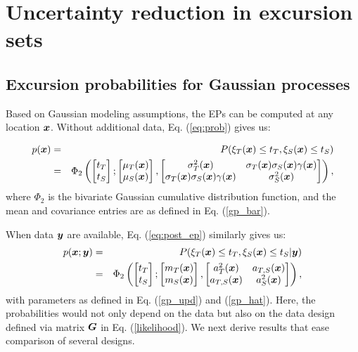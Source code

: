 \documentclass[aoas]{imsart}
\begin{document}
\section{Uncertainty reduction in excursion sets}
\label{sec:sur}

\subsection{Excursion probabilities for Gaussian processes}

Based on Gaussian modeling assumptions, the EPs can be computed at any
location ${\boldsymbol x}$. Without additional data, Eq.  (\ref{eq:prob}) gives us:

\begin{eqnarray}\label{eq:prob_mv0}
 p(\bx) &=& P(\xi_T(\bx) \leq t_T, \xi_S(\bx) \leq t_S) \nonumber \\
 &=& \Phi_2 \begin{pmatrix} 
\begin{bmatrix} t_T\\
t_S
\end{bmatrix};
\begin{bmatrix} \mu_{T}(\bx)\\
\mu_{S}(\bx)
\end{bmatrix},\begin{bmatrix}
\sigma_{T}^2(\bx) & \sigma_{T}(\bx)\sigma_{S}(\bx) \gamma(\bx)  \\
\sigma_{T}(\bx)\sigma_{S}(\bx) \gamma(\bx)  & \sigma_{S}^2(\bx)  
\end{bmatrix}\end{pmatrix},
\end{eqnarray}
where $\Phi_2$ is the bivariate Gaussian cumulative distribution
function, and the mean and covariance entries are as defined in Eq. (\ref{gp_bar}).

When data ${\boldsymbol y}$ are available, Eq. (\ref{eq:post_ep}) similarly gives
us:
\begin{eqnarray}\label{eq:prob_mv}
 p(\bx;\by) &=& P(\xi_T(\bx) \leq t_T, \xi_S(\bx) \leq t_S |\by)
 \nonumber \\
 &=& \Phi_2 \begin{pmatrix} 
\begin{bmatrix} t_T\\
t_S
\end{bmatrix};
\begin{bmatrix} m_{T}(\bx)\\
m_{S}(\bx)
\end{bmatrix},\begin{bmatrix}
a_{T}^2(\bx) & a_{T,S}(\bx)  \\
a_{T,S}(\bx)  & a_{S}^2(\bx)  
\end{bmatrix}\end{pmatrix},
\end{eqnarray}
with parameters as defined in Eq. (\ref{gp_upd}) and (\ref{gp_hat}). Here, the probabilities would not only depend on the data but also on the data design defined via matrix ${\boldsymbol G}$ in Eq. (\ref{likelihood}). We next derive results that ease comparison of several designs.
\end{document}
